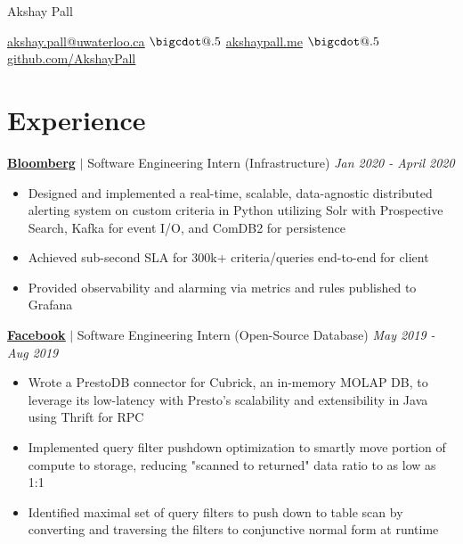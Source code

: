 \documentclass[paper=a4,fontsize=15pt]{scrartcl}
\makeatletter
\newcommand*\bigcdot{\mathpalette\bigcdot@{.5}}
\newcommand*\bigcdot@[2]{\mathbin{\vcenter{\hbox{\scalebox{#2}{$\m@th#1\bullet$}}}}}
\newcommand{\smolboispace}{\vspace*{0.1em}}
\newcommand{\halfspace}{\vspace*{0.5em}}
\newcommand{\bighalfspace}{\vspace*{0.75em}}
\newcommand{\http}[1]{\href{http://#1}{\ul{#1}}}
\newcommand{\https}[1]{\href{https://#1}{\ul{#1}}}
\newcommand{\email}[1]{\href{mailto:#1}{\ul{#1}}}
\makeatother
\begin{document}
\begin{center}
  {\fontsize{35}{40}\selectfont Akshay Pall \par}
  \halfspace
  \smolboispace
  \smolboispace

  {\normalsize
    \email{akshay.pall@uwaterloo.ca}
    $\bigcdot$ \http{akshaypall.me}
    $\bigcdot$ \https{github.com/AkshayPall}
    \par}
\end{center}

 \section*{Experience}{}
\normalsize
\noindent \href{https://bloomberg.com}{\textbf{\ul{Bloomberg}}}
$\vert$ \small Software Engineering Intern (Infrastructure)
{\hfill \footnotesize \textit{Jan 2020 - April 2020}}
\begin{itemize}[noitemsep,leftmargin=20pt,label=\raisebox{0.25ex}{\tiny$\bullet$},topsep=5pt]
  \small
 
  \item Designed and implemented a real-time, scalable, data-agnostic distributed alerting system on custom criteria in Python utilizing Solr with Prospective Search, Kafka for event I/O, and ComDB2 for persistence
  
  \item Achieved sub-second SLA for 300k+ criteria/queries end-to-end for client
  
  \item Provided observability and alarming via metrics and rules published to Grafana
  
\end{itemize}

\smolboispace
\smolboispace
\bighalfspace
\normalsize
\noindent \href{https://facebook.com}{\textbf{\ul{Facebook}}}
$\vert$ \small Software Engineering Intern (Open-Source Database)
{\hfill \footnotesize \textit{May 2019 - Aug 2019}}
\begin{itemize}[noitemsep,leftmargin=20pt,label=\raisebox{0.25ex}{\tiny$\bullet$},topsep=5pt]
  \small
    \item Wrote a PrestoDB connector for Cubrick, an in-memory MOLAP DB, to leverage its low-latency with Presto's scalability and extensibility in Java using Thrift for RPC
    \item Implemented query filter pushdown optimization to smartly move portion of compute to storage, reducing "scanned to returned" data ratio to as low as 1:1
    \item Identified maximal set of query filters to push down to table scan by converting and traversing the filters to conjunctive normal form at runtime
\end{itemize}
\end{document}
